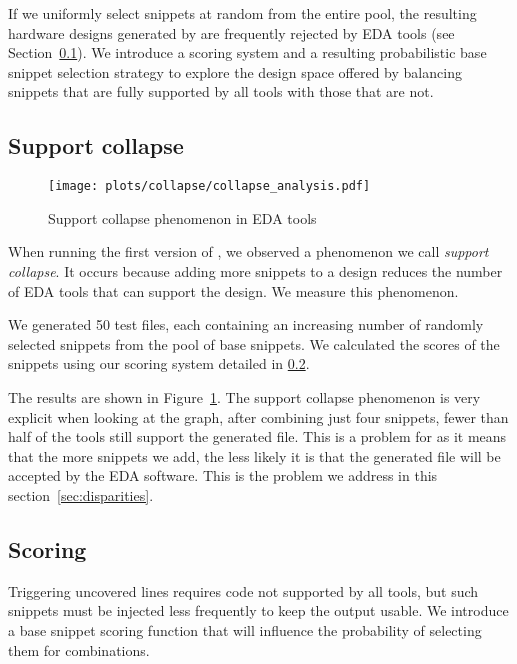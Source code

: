 If we uniformly select snippets at random from the entire pool, the resulting hardware designs generated by \ourname are frequently rejected by EDA tools (see Section~\ref{sec:disparities:support-collapse}).
We introduce a scoring system and a resulting probabilistic base snippet selection strategy to explore the design space offered by balancing snippets that are fully supported by all tools with those that are not.

\subsection{Support collapse}\label{sec:disparities:support-collapse}
\begin{figure}
    \centering
    \texttt{[image: plots/collapse/collapse\_analysis.pdf]}
    \caption{Support collapse phenomenon in EDA tools}
    \label{fig:support_collapse}
\end{figure}

When running the first version of \ourname, we observed a phenomenon we call \emph{support collapse}.
It occurs because adding more snippets to a design reduces the number of EDA tools that can support the design.
We measure this phenomenon.

We generated 50 test files, each containing an increasing number of randomly selected snippets from the pool of base snippets.
We calculated the scores of the snippets using our scoring system detailed in \ref{sec:disparities:scoring}.

The results are shown in Figure~\ref{fig:support_collapse}.
The support collapse phenomenon is very explicit when looking at the graph, after combining just four snippets, fewer than half of the tools still support the generated file.
This is a problem for \ourname as it means that the more snippets we add, the less likely it is that the generated file will be accepted by the EDA software.
This is the problem we address in this section~\ref{sec:disparities}.

\subsection{Scoring}
\label{sec:disparities:scoring}

Triggering uncovered lines requires code not supported by all tools, but such snippets must be injected less frequently to keep the output usable.
We introduce a base snippet scoring function that will influence the probability of selecting them for combinations.


